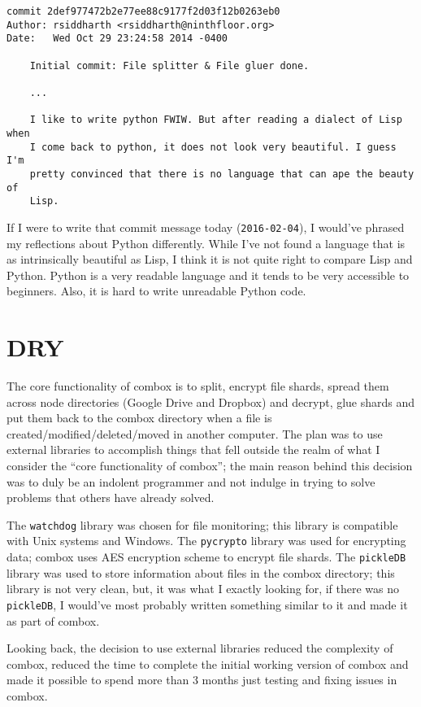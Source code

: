 \begin{verbatim}
commit 2def977472b2e77ee88c9177f2d03f12b0263eb0
Author: rsiddharth <rsiddharth@ninthfloor.org>
Date:   Wed Oct 29 23:24:58 2014 -0400

    Initial commit: File splitter & File gluer done.

    ...

    I like to write python FWIW. But after reading a dialect of Lisp when
    I come back to python, it does not look very beautiful. I guess I'm
    pretty convinced that there is no language that can ape the beauty of
    Lisp.
\end{verbatim}

If I were to write that commit message today (\verb+2016-02-04+), I
would've phrased my reflections about Python differently. While I've
not found a language that is as intrinsically beautiful as Lisp, I
think it is not quite right to compare Lisp and Python. Python is a
very readable language and it tends to be very accessible to
beginners. Also, it is hard to write unreadable Python code.

\section{DRY}

The core functionality of combox is to split, encrypt file shards,
spread them across node directories (Google Drive and Dropbox) and
decrypt, glue shards and put them back to the combox directory when a
file is created/modified/deleted/moved in another computer. The plan
was to use external libraries to accomplish things that fell outside
the realm of what I consider the ``core functionality of combox''; the
main reason behind this decision was to duly be an indolent programmer
and not indulge in trying to solve problems that others have already
solved.

The \verb+watchdog+\cite{pylib:watchdog} library was chosen for file
monitoring; this library is compatible with Unix systems and
Windows. The \verb+pycrypto+ library\cite{pylib:pycrypto} was used for
encrypting data; combox uses AES encryption scheme to encrypt file
shards. The \verb+pickleDB+\cite{pylib:pickledb} library was used to
store information about files in the combox directory; this library is
not very clean, but, it was what I exactly looking for, if there was
no \verb+pickleDB+, I would've most probably written something similar
to it and made it as part of combox.

Looking back, the decision to use external libraries reduced the
complexity of combox, reduced the time to complete the initial working
version of combox and made it possible to spend more than 3 months
just testing and fixing issues in combox.

